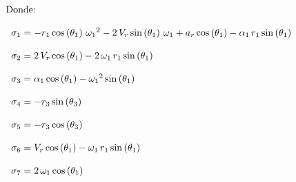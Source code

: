 \documentclass[12pt]{article}
\begin{document}
\newpage
\normalsize
\begin{equation*}
\mathrm{}\\
\begin{array}{l}
\textrm{Donde:}\\
\mathrm{}\\
\;\;\sigma_1 =-r_1 \,\mathrm{cos}\left(\theta_1 \right)\,{\omega_1 }^2 -2\,V_r \,\mathrm{sin}\left(\theta_1 \right)\,\omega_1 +a_r \,\mathrm{cos}\left(\theta_1 \right)-\alpha_1 \,r_1 \,\mathrm{sin}\left(\theta_1 \right)\\
\mathrm{}\\
\;\;\sigma_2 =2\,V_r \,\mathrm{cos}\left(\theta_1 \right)-2\,\omega_1 \,r_1 \,\mathrm{sin}\left(\theta_1 \right)\\
\mathrm{}\\
\;\;\sigma_3 =\alpha_1 \,\mathrm{cos}\left(\theta_1 \right)-{\omega_1 }^2 \,\mathrm{sin}\left(\theta_1 \right)\\
\mathrm{}\\
\;\;\sigma_4 =-r_3 \,\mathrm{sin}\left(\theta_3 \right)\\
\mathrm{}\\
\;\;\sigma_5 =-r_3 \,\mathrm{cos}\left(\theta_3 \right)\\
\mathrm{}\\
\;\;\sigma_6 =V_r \,\mathrm{cos}\left(\theta_1 \right)-\omega_1 \,r_1 \,\mathrm{sin}\left(\theta_1 \right)\\
\mathrm{}\\
\;\;\sigma_7 =2\,\omega_1 \,\mathrm{cos}\left(\theta_1 \right)
\end{array}
\end{equation*}
\newpage
\end{document}
